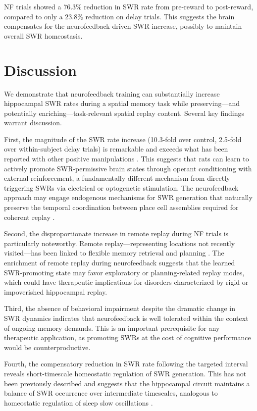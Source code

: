 \documentclass[11pt]{article}
\begin{document}
NF trials showed a 76.3\% reduction in SWR rate from pre-reward to post-reward, compared to only a 23.8\% reduction on delay trials. This suggests the brain compensates for the neurofeedback-driven SWR increase, possibly to maintain overall SWR homeostasis.

\section{Discussion}

We demonstrate that neurofeedback training can substantially increase hippocampal SWR rates during a spatial memory task while preserving---and potentially enriching---task-relevant spatial replay content. Several key findings warrant discussion.

First, the magnitude of the SWR rate increase (10.3-fold over control, 2.5-fold over within-subject delay trials) is remarkable and exceeds what has been reported with other positive manipulations \citep{fernandez-ruiz2019}. This suggests that rats can learn to actively promote SWR-permissive brain states through operant conditioning with external reinforcement, a fundamentally different mechanism from directly triggering SWRs via electrical or optogenetic stimulation. The neurofeedback approach may engage endogenous mechanisms for SWR generation that naturally preserve the temporal coordination between place cell assemblies required for coherent replay \citep{stark2015}.

Second, the disproportionate increase in remote replay during NF trials is particularly noteworthy. Remote replay---representing locations not recently visited---has been linked to flexible memory retrieval and planning \citep{pfeiffer2013, carr2011}. The enrichment of remote replay during neurofeedback suggests that the learned SWR-promoting state may favor exploratory or planning-related replay modes, which could have therapeutic implications for disorders characterized by rigid or impoverished hippocampal replay.

Third, the absence of behavioral impairment despite the dramatic change in SWR dynamics indicates that neurofeedback is well tolerated within the context of ongoing memory demands. This is an important prerequisite for any therapeutic application, as promoting SWRs at the cost of cognitive performance would be counterproductive.

Fourth, the compensatory reduction in SWR rate following the targeted interval reveals short-timescale homeostatic regulation of SWR generation. This has not been previously described and suggests that the hippocampal circuit maintains a balance of SWR occurrence over intermediate timescales, analogous to homeostatic regulation of sleep slow oscillations \citep{roux2017}.
\end{document}
